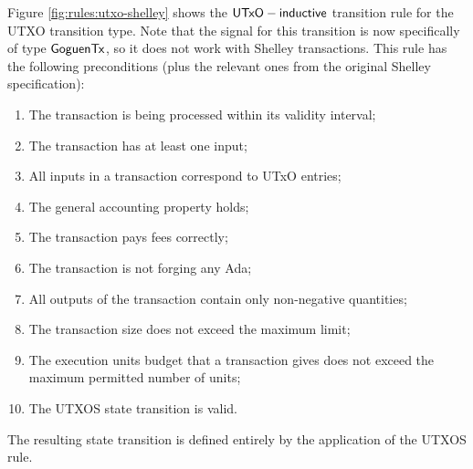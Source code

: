 Figure \ref{fig:rules:utxo-shelley} shows the $\mathsf{UTxO-inductive}$
transition rule for the UTXO transition type. Note that the
signal for this transition is now specifically of type $\mathsf{GoguenTx}$, so it does not
work with Shelley transactions. This rule has the following preconditions (plus the relevant ones
from the original Shelley specification):

\begin{enumerate}
  \item The transaction is being processed within its validity interval;

  \item The transaction has at least one input;

  \item All inputs in a transaction correspond to UTxO entries;

  \item The general accounting property holds;

  \item The transaction pays fees correctly;

  \item The transaction is not forging any Ada;

  \item All outputs of the transaction contain only non-negative quantities;

  \item The transaction size does not exceed the maximum limit;

 \item The execution units budget that a transaction gives does not exceed the maximum
  permitted number of units;

  \item The UTXOS state transition is valid.
\end{enumerate}

The resulting state transition is defined entirely by the application of the
UTXOS rule.

